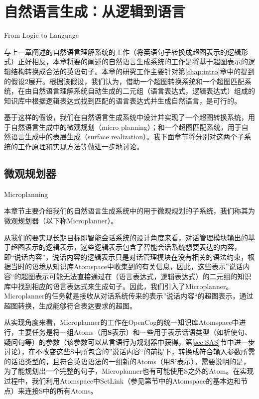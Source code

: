 \chapter{自然语言生成：从逻辑到语言}{From Logic to Language}
\label{chap:generation}

与上一章阐述的自然语言理解系统的工作（将英语句子转换成超图表示的逻辑形式）正好相反，本章将要的阐述的自然语言生成系统的工作是将基于超图表示的逻辑结构转换成合法的英语句子。本章的研究工作主要针对第\ref{chap:intro}章中的提到的假设2展开。根据该假设，我们认为，借助一个超图转换系统和一个超图匹配系统，在由自然语言理解系统自动生成的二元组（语言表达式，逻辑表达式）组成的知识库中根据逻辑表达式找到匹配的语言表达式并生成自然语言，是可行的。

基于这样的假设，我们在自然语言生成系统中设计并实现了一个超图转换系统，用于自然语言生成中的微观规划（micro planning）；和一个超图匹配系统，用于自然语言生成中的表层生成（surface realization）。我下面章节将分别对这两个子系统的工作原理和实现方法等做进一步地讨论。

\section{微观规划器}{Microplanning}

本章节主要介绍我们的自然语言生成系统中的用于微观规划的子系统，我们称其为微观规划器（以下称Microplanner）。

从我们的要实现长期目标即智能会话系统的设计角度来看，对话管理模块输出的基于超图表示的逻辑表示，这些逻辑表示包含了智能会话系统想要表达的内容，即“说话内容”，说话内容的逻辑表示只是对话管理模块在没有相关的语法约束，根据当时的语境从知识库Atomspace中收集到的有关信息，因此，这些表示”说话内容“的超图表示可能无法直接通过在（语言表达式，逻辑表达式）的二元组的知识库中找到相应的语言表达式来生成句子。因此，我们引入了Microplanner。Microplanner的任务就是接收从对话系统传来的表示”说话内容“的超图表示，通过超图转换，生成能够符合表达要求的超图。

从实现角度来看，Microplanner的工作在OpenCog的统一知识库Atomspace中进行，主要任务是将一组Atoms（用{\bf S}表示）和一些用于表示话语类型（如祈使句、疑问句等）的参数（该参数可以从言语行为规划器中获得，第\ref{sec:SAS}节中进一步讨论），在不改变这些S中所包含的”说话内容“的前提下，转换成符合输入参数所需的话语类型的，且符合英语语法的一组新的Atoms（用{\bf S'}表示）。需要说明的是，为了能规划出一个完整的句子，Microplanner也有可能使用S之外的Atom。在实现过程中，我们利用Atomspace中SetLink（参见第\label{sec:atoms}节中的Atomspace的基本边和节点）来连接S中的所有Atoms。

